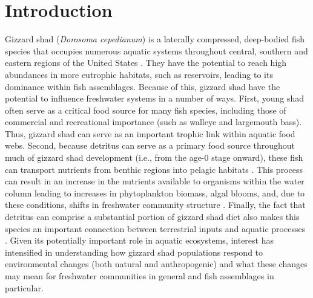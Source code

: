 \documentclass[preprint,review,12pt,authoryear]{elsarticle}
\begin{document}
\section{Introduction}
Gizzard shad (\emph{Dorosoma cepedianum}) is a laterally compressed, deep-bodied fish species that occupies numerous aquatic systems throughout central, southern and eastern regions of the United States \citep{pierce1981aspects,vanni2005linking}.  
They have the potential to reach high abundances in more eutrophic habitats, such as reservoirs, leading to its dominance within fish assemblages. 
Because of this, gizzard shad have the potential to influence freshwater systems in a number of ways. 
First, young shad often serve as a critical food source for many fish species, including those of commercial and recreational importance (such as walleye and largemouth bass)\citep{jester1972life}. 
Thus, gizzard shad can serve as an important trophic link within aquatic food webs.
Second, because detritus can serve as a primary food source throughout much of gizzard shad development 
(i.e., from the age-0 stage onward), these fish can transport nutrients
from benthic regions into pelagic habitats \citep{mather1995regeneration, schaus2000effects, vanni2005linking}. 
This process can result in an increase in the nutrients available to organisms within the water column leading to increases in phytoplankton biomass, algal blooms, and, due to these conditions, shifts in freshwater community structure \citep{aday2003direct, schaus2000effects}. 
Finally, the fact that detritus can comprise a substantial portion of gizzard shad diet also makes this species an important connection between terrestrial inputs and aquatic processes \citep{schaus2000effects}.
Given its potentially important role in aquatic ecosystems, interest has intensified in understanding how gizzard shad populations respond to environmental changes (both natural and anthropogenic) and what these changes may mean for freshwater communities in general and fish assemblages in particular.
\end{document}
